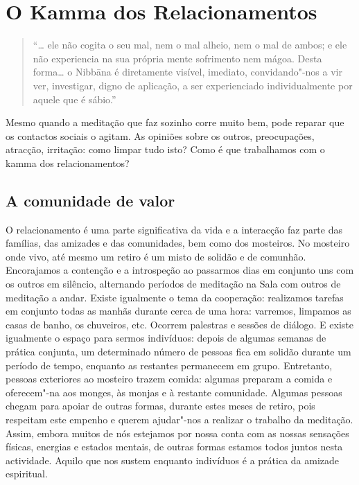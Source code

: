 
\chapter{O Kamma dos Relacionamentos}


\begin{quote}
  ``\ldots{} ele não cogita o seu mal, nem o mal alheio, nem o mal de ambos; e
  ele não experiencia na sua própria mente sofrimento nem mágoa. Desta
  forma\ldots{} o Nibbāna é diretamente visível, imediato, convidando"-nos a vir
  ver, investigar, digno de aplicação, a ser experienciado individualmente por
  aquele que é sábio.''

\end{quote}

Mesmo quando a meditação que faz sozinho corre muito bem, pode reparar que os
contactos sociais o agitam. As opiniões sobre os outros, preocupações, atracção,
irritação: como limpar tudo isto? Como é que trabalhamos com o kamma dos
relacionamentos?

\section{A comunidade de valor}

O relacionamento é uma parte significativa da vida e a interacção faz parte das
famílias, das amizades e das comunidades, bem como dos mosteiros. No mosteiro
onde vivo, até mesmo um retiro é um misto de solidão e de comunhão. Encorajamos
a contenção e a introspeção ao passarmos dias em conjunto uns com os outros em
silêncio, alternando períodos de meditação na Sala com outros de meditação a
andar. Existe igualmente o tema da cooperação: realizamos tarefas em conjunto
todas as manhãs durante cerca de uma hora: varremos, limpamos as casas de banho,
os chuveiros, etc. Ocorrem palestras e sessões de diálogo. E existe igualmente o
espaço para sermos indivíduos: depois de algumas semanas de prática conjunta, um
determinado número de pessoas fica em solidão durante um período de tempo,
enquanto as restantes permanecem em grupo. Entretanto, pessoas exteriores ao
mosteiro trazem comida: algumas preparam a comida e oferecem"-na aos monges, às
monjas e à restante comunidade. Algumas pessoas chegam para apoiar de outras
formas, durante estes meses de retiro, pois respeitam este empenho e querem
ajudar"-nos a realizar o trabalho da meditação. Assim, embora muitos de nós
estejamos por nossa conta com as nossas sensações físicas, energias e estados
mentais, de outras formas estamos todos juntos nesta actividade. Aquilo que nos
sustem enquanto indivíduos é a prática da amizade espiritual.

